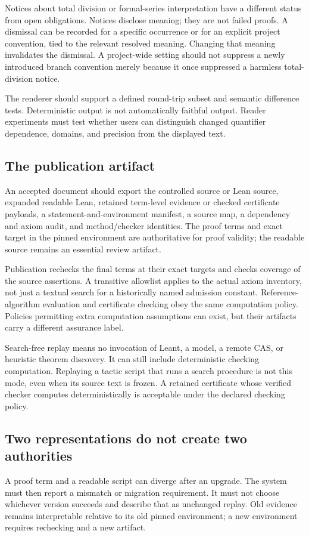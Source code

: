 \documentclass[11pt,a4paper]{article}
\theoremstyle{remark}\newtheorem{example}[proposition]{Example}
\begin{document}
Notices about total division or formal-series interpretation have a different status from open obligations. Notices disclose meaning; they are not failed proofs. A dismissal can be recorded for a specific occurrence or for an explicit project convention, tied to the relevant resolved meaning. Changing that meaning invalidates the dismissal. A project-wide setting should not suppress a newly introduced branch convention merely because it once suppressed a harmless total-division notice.

The renderer should support a defined round-trip subset and semantic difference tests. Deterministic output is not automatically faithful output. Reader experiments must test whether users can distinguish changed quantifier dependence, domains, and precision from the displayed text.

\subsection{The publication artifact}
An accepted document should export the controlled source or Lean source, expanded readable Lean, retained term-level evidence or checked certificate payloads, a statement-and-environment manifest, a source map, a dependency and axiom audit, and method/checker identities. The proof terms and exact target in the pinned environment are authoritative for proof validity; the readable source remains an essential review artifact.

Publication rechecks the final terms at their exact targets and checks coverage of the source assertions. A transitive allowlist applies to the actual axiom inventory, not just a textual search for a historically named admission constant. Reference-algorithm evaluation and certificate checking obey the same computation policy. Policies permitting extra computation assumptions can exist, but their artifacts carry a different assurance label.

Search-free replay means no invocation of Leant, a model, a remote CAS, or heuristic theorem discovery. It can still include deterministic checking computation. Replaying a tactic script that runs a search procedure is not this mode, even when its source text is frozen. A retained certificate whose verified checker computes deterministically is acceptable under the declared checking policy.

\subsection{Two representations do not create two authorities}
A proof term and a readable script can diverge after an upgrade. The system must then report a mismatch or migration requirement. It must not choose whichever version succeeds and describe that as unchanged replay. Old evidence remains interpretable relative to its old pinned environment; a new environment requires rechecking and a new artifact.
\end{document}
